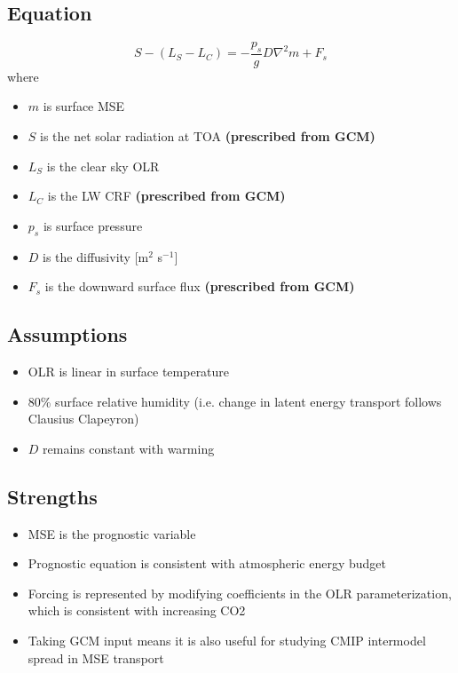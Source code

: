 \documentclass{article}
\begin{document}
\section{\cite{hwang2010}}
\subsection{Equation}
\begin{equation}
    S - (L_S - L_C) = -\frac{p_s}{g}D\nabla^2 m + F_s
\end{equation}
where
\begin{itemize}
    \item $m$ is surface MSE
    \item $S$ is the net solar radiation at TOA \textbf{(prescribed from GCM)}
    \item $L_S$ is the clear sky OLR
    \item $L_C$ is the LW CRF \textbf{(prescribed from GCM)}
    \item $p_s$ is surface pressure
    \item $D$ is the diffusivity [m$^2$ s$^{-1}$]
    \item $F_s$ is the downward surface flux \textbf{(prescribed from GCM)}
\end{itemize}

\subsection{Assumptions}
\begin{itemize}
    \item OLR is linear in surface temperature
    \item 80\% surface relative humidity (i.e. change in latent energy transport follows Clausius Clapeyron)
    \item $D$ remains constant with warming
\end{itemize}

\subsection{Strengths}
\begin{itemize}
    \item MSE is the prognostic variable
    \item Prognostic equation is consistent with atmospheric energy budget
    \item Forcing is represented by modifying coefficients in the OLR parameterization, which is consistent with increasing CO2
    \item Taking GCM input means it is also useful for studying CMIP intermodel spread in MSE transport
\end{itemize}
\end{document}
